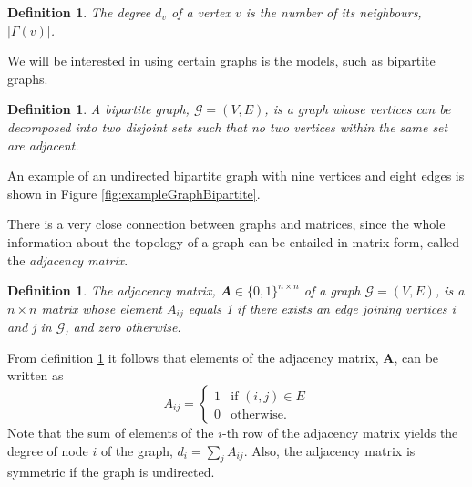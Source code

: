 \documentclass[12pt]{article}
\numberwithin{equation}{section}
\newtheorem{definition}[theorem]{Definition}
\begin{document}
\begin{definition}
\label{def:degreeNode}
	The degree $d_{v}$ of a vertex $v$ is the number of its neighbours, $\left\vert{\Gamma(v)}\right\vert$.
\end{definition}
We will be interested in using certain graphs is the models, such as bipartite graphs.
\begin{definition}
\label{def:bipartiteGraph}
	A bipartite graph, $\mathcal{G} = (V,E)$, is a graph whose vertices can be decomposed into two disjoint sets such that no two vertices within the same set are adjacent.
\end{definition}
An example of an undirected bipartite graph with nine vertices and eight edges is shown in Figure \ref{fig:exampleGraphBipartite}.



There is a very close connection between graphs and matrices, since the whole information about the topology of a graph can be entailed in matrix form, called the \textit{adjacency matrix}.
\begin{definition}
	\label{def:adjacencyMatrix}
	The adjacency matrix, $\mathbfit{A} \in \{0,1\}^{n \times n}$ of a graph $\mathcal{G} = (V,E)$, is a $n\times n$ matrix whose element $A_{ij}$ equals 1 if there exists an edge joining vertices i and j in $\mathcal{G}$, and zero otherwise.
\end{definition}
From definition \ref{def:adjacencyMatrix} it follows that elements of the adjacency matrix, $\mathbf{A}$, can be written as
\begin{equation*}
	A_{ij} =
	\begin{cases}
		1 & \text{if } (i,j) \in E\\
		0 & \text{otherwise}.
	\end{cases}
\end{equation*}
Note that the sum of elements of the $i$-th row of the adjacency matrix yields the degree of node $i$ of the graph, $d_{i} = \sum_{j} A_{ij}$. Also, the adjacency matrix is symmetric if the graph is undirected.
\end{document}

